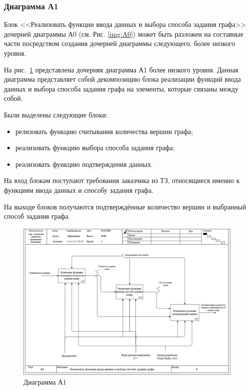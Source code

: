 \documentclass[a4paper, final]{article}
\begin{document}
\subsubsection{Диаграмма А1}
Блок <<Реализовать функции ввода данных и выбора способа задания графа>> дочерней диаграммы А0 (см. Рис. \ref{img:A0}) может 
быть разложен на составные части посредством создания дочерней диаграммы следующего, более низкого уровня.

На рис.~\ref{img:A1} представлена дочерняя диаграмма А1 более низкого уровня. Данная диаграмма представляет собой 
декомпозицию блока реализации функций ввода данных и выбора способа задания графа на элементы, которые связаны между собой. 

Были выделены следующие блоки:
\begin{itemize}
	\item релизовать функцию считывания количества вершин графа;
	\item реализовать функцию выбора способа задания графа;
	\item реализовать функцию подтверждения данных.
\end{itemize} 

На вход блокам поступают требования заказчика из ТЗ, относящиеся именно к функциям ввода данных и способу задания графа.

На выходе блоков получаются подтверждённые количество вершин и выбранный способ задания графа.

\newpage
\begin{figure}[H]
	\centering
	\includegraphics[width=\linewidth]{A1.png}
	\caption{Диаграмма А1}
	\label{img:A1}
\end{figure}
\end{document}
